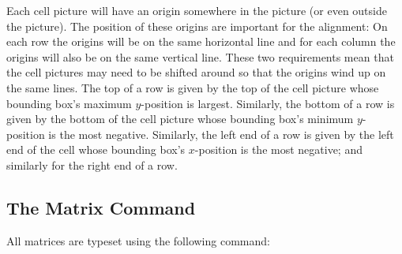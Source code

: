 Each cell picture will have an origin somewhere in the picture (or even outside
the picture). The position of these origins are important for the alignment: On
each row the origins will be on the same horizontal line and for each column
the origins will also be on the same vertical line. These two requirements mean
that the cell pictures may need to be shifted around so that the origins wind
up on the same lines. The top of a row is given by the top of the cell picture
whose bounding box's maximum $y$-position is largest. Similarly, the bottom of
a row is given by the bottom of the cell picture whose bounding box's minimum
$y$-position is the most negative. Similarly, the left end of a row is given by
the left end of the cell whose bounding box's $x$-position is the most
negative; and similarly for the right end of a row.
%
\begin{codeexample}[]
\end{codeexample}


\subsection{The Matrix Command}

All matrices are typeset using the following command:

